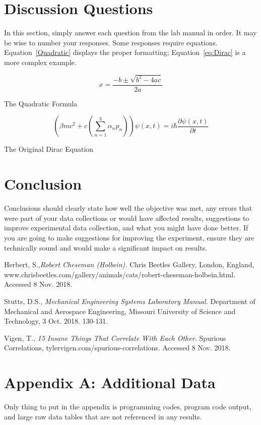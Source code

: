 \documentclass[11pt,letter]{report}
\begin{document}
\section*{Discussion Questions}
In this section, simply answer each question from the lab manual in order. It may be wise to number your responses. Some responses require equations. Equation~\ref{Quadratic} displays the proper formatting; Equation~\ref{eq:Dirac} is a more complex example.

\begin{eqfloat}[!htb]
\begin{equation*}
x=\frac{-b\pm\sqrt{b^2-4ac}}{2a}
\end{equation*}
\caption{The Quadratic Formula}\label{Quadratic}
\end{eqfloat}
	
\begin{eqfloat}
\begin{equation*}
\left (
    \beta mc^2 + c 
       \left ( 
           \sum_{n=1}^3 \alpha_n p_n 
       \right )
\right )
\psi(x,t)
=
i \hbar \dfrac{\partial \psi(x,t) }{\partial t}
\end{equation*}
\caption{The Original Dirac Equation}\label{eq:Dirac}
\end{eqfloat}

\section*{Conclusion}
Conclusions should clearly state how well the objective was met, any errors that were part of your data collections or would have affected results, suggestions to improve experimental data collection, and what you might have done better. If you are going to make suggestions for improving the experiment, ensure they are technically sound and would make a significant impact on results.

\begin{thebibliography}{3} %

  Herbert, S.,\emph{Robert Cheseman (Holbein).}
  Chris Beetles Gallery, London, England, www.chrisbeetles.com/gallery/animals/cats/robert-cheseman-holbein.html. Accessed 8 Nov. 2018.
  
  Stutts, D.S., \emph{Mechanical Engineering Systems Laboratory Manual.}
  Department of Mechanical and Aerospace Engineering, Missouri University of Science and Technology, 3 Oct. 2018. 130-131.
  
  Vigen, T., \emph{15 Insane Things That Correlate With Each Other.}
  Spurious Correlations, tylervigen.com/spurious-correlations. Accessed 8 Nov. 2018.

\end{thebibliography}

\newpage %
\section*{Appendix A: Additional Data}
Only thing to put in the appendix is programming codes, program code output, and large raw data tables that are not referenced in any results.
\end{document}
